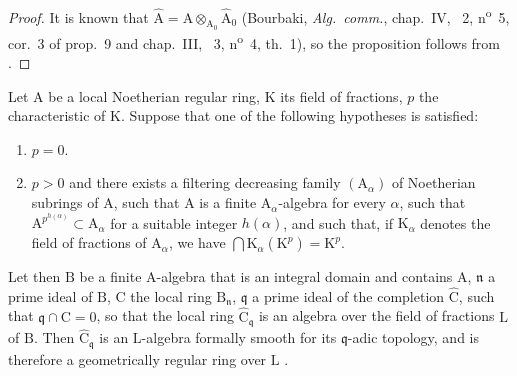 \begin{proof}
It is known that $\widehat{\mathrm{A}}=\mathrm{A}\otimes_{\mathrm{A}_0}\widehat{\mathrm{A}}_0$ (Bourbaki, \emph{Alg.~comm.}, chap.~IV, \textsection~2, n\textsuperscript{o}~5, cor.~3 of prop.~9 and chap.~III, \textsection~3, n\textsuperscript{o}~4, th.~1), so the proposition follows from .
\end{proof}

\begin{proposition}[22.3.2]
\label{0.22.3.2}
Let $\mathrm{A}$ be a local Noetherian regular ring, $\mathrm{K}$ its field of fractions, $p$ the characteristic of $\mathrm{K}$.
Suppose that one of the following hypotheses is satisfied:
\begin{enumerate}
  \item[\rm{(i)}] $p=0$.
  \item[\rm{(ii)}] $p>0$ and there exists a filtering decreasing family $(\mathrm{A}_\alpha)$ of Noetherian subrings of $\mathrm{A}$, such that $\mathrm{A}$ is a finite $\mathrm{A}_\alpha$-algebra for every $\alpha$, such that $\mathrm{A}^{p^{h(\alpha)}}\subset\mathrm{A}_\alpha$ for a suitable integer $h(\alpha)$, and such that, if $\mathrm{K}_\alpha$ denotes the field of fractions of $\mathrm{A}_\alpha$, we have $\bigcap\mathrm{K}_\alpha(\mathrm{K}^p)=\mathrm{K}^p$.
\end{enumerate}

Let then $\mathrm{B}$ be a finite $\mathrm{A}$-algebra that is an integral domain and contains $\mathrm{A}$, $\mathfrak{n}$ a prime ideal of $\mathrm{B}$, $\mathrm{C}$ the local ring $\mathrm{B}_\mathfrak{n}$, $\mathfrak{q}$ a prime ideal of the completion $\widehat{\mathrm{C}}$, such that $\mathfrak{q}\cap\mathrm{C}=0$, so that the local ring $\widehat{\mathrm{C}}_\mathfrak{q}$ is an algebra over the field of fractions $\mathrm{L}$ of $\mathrm{B}$.
Then $\widehat{\mathrm{C}}_\mathfrak{q}$ is an $\mathrm{L}$-algebra formally smooth for its $\mathfrak{q}$-adic topology, and is therefore a geometrically regular ring over $\mathrm{L}$ .
\end{proposition}

